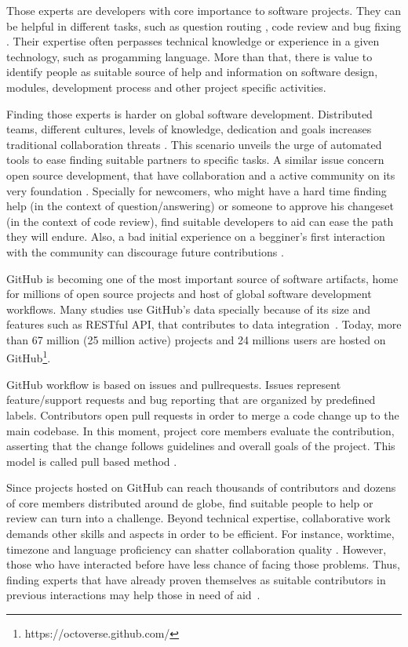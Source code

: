 \documentclass[conference]{IEEEtran}
\begin{document}
Those experts are developers with core importance to software projects. They can be helpful in different tasks, such as question routing \cite{sun2018}, code review \cite{xia2017} and bug fixing \cite{cavalcanti2014}. Their expertise often perpasses technical knowledge or experience in a given technology, such as progamming language. More than that, there is value to identify people as suitable source of help and information on software design, modules, development process and other project specific activities.

Finding those experts is harder on global software development. Distributed teams, different  cultures, levels of knowledge, dedication and goals increases traditional collaboration threats \cite{casey2010}. This scenario unveils the urge of automated tools to ease finding suitable partners to specific tasks. A similar issue concern open source development, that have collaboration and a active community on its very foundation \cite{gutwin2004}. Specially for newcomers, who might have a hard time finding help (in the context of question/answering) or someone to approve his changeset (in the context of code review), find suitable developers to aid can ease the path they will endure. Also, a bad initial experience on a begginer's first interaction with the community can discourage future contributions \cite{Bosu2014}.

GitHub is becoming one of the most important source of software artifacts, home for millions of open source projects and host of global software development workflows. Many studies use GitHub's data specially because of its size and features such as RESTful API, that contributes to data integration~\cite{kalliamvakou2014}. Today, more than 67 million (25 million active) projects and 24 millions users are hosted on GitHub\footnote{https://octoverse.github.com/}.

GitHub workflow is based on issues and pullrequests. Issues represent feature/support requests and bug reporting that are organized by predefined labels. Contributors open pull requests in order to merge a code change up to the main codebase. In this moment, project core members evaluate the contribution, asserting that the change follows guidelines and overall goals of the project. This model is called pull based method \cite{gousios2014}.

Since projects hosted on GitHub can reach thousands of contributors and dozens of core members distributed around de globe, find suitable people to help or review can turn into a challenge. Beyond technical expertise, collaborative work demands other skills and aspects in order to be efficient. For instance, worktime, timezone and language proficiency can shatter collaboration quality \cite{rubin2016}. However, those who have interacted before have less chance of facing those problems. Thus, finding experts that have already proven themselves as suitable contributors in previous interactions may help those in need of aid~\cite{aggarwal2011}.
\end{document}
